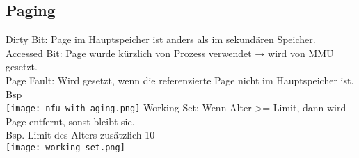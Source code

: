 \subsection{Paging}
\textcolor{myblue}{Dirty Bit}: Page im Hauptspeicher ist anders als im sekundären Speicher.\\
\textcolor{myblue}{Accessed Bit}: Page wurde kürzlich von Prozess verwendet → wird von MMU
gesetzt.\\
\textcolor{myblue}{Page Fault}: Wird gesetzt, wenn die referenzierte Page nicht im Hauptspeicher
ist.\\
\textcolor{myblue}{Bsp}\\
\texttt{[image: nfu\_with\_aging.png]}
\textcolor{myblue}{Working Set}: Wenn Alter >= Limit, dann wird Page entfernt, sonst bleibt sie.\\
Bsp. Limit des Alters zusätzlich 10\\
\texttt{[image: working\_set.png]}